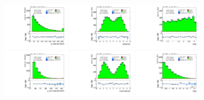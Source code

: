 \clearpage

\begin{figure}[tp]
  \centering
  \includegraphics[width=0.30\textwidth]{figures/analysis/vbf-QCDCR/jet-1-pt}
  \includegraphics[width=0.30\textwidth]{figures/analysis/vbf-QCDCR/jet-1-eta}
  \includegraphics[width=0.30\textwidth]{figures/analysis/vbf-QCDCR/jets-dphi} \\
  \includegraphics[width=0.30\textwidth]{figures/analysis/vbf-QCDCR/jet-2-pt}
  \includegraphics[width=0.30\textwidth]{figures/analysis/vbf-QCDCR/jet-2-eta}
  \includegraphics[width=0.30\textwidth]{figures/analysis/vbf-QCDCR/jets-deta} \\

\end{figure}
